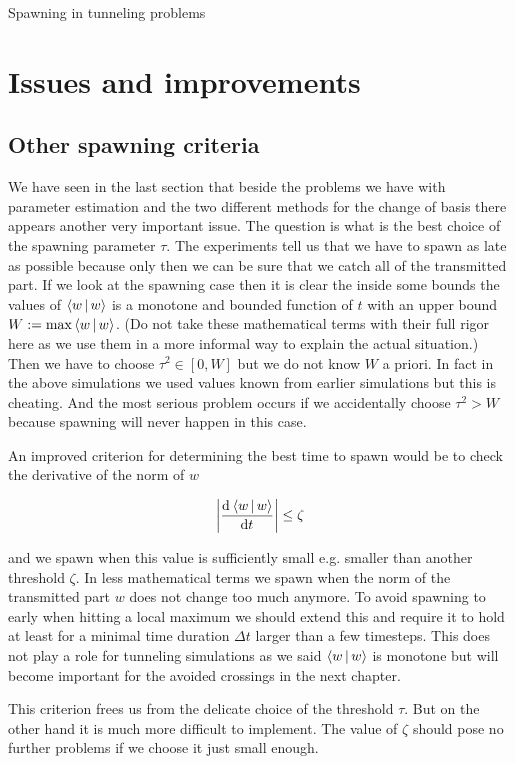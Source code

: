 \begin{chapter}{Spawning in tunneling problems}
\FloatBarrier
\section{Issues and improvements}

\subsection{Other spawning criteria}

We have seen in the last section that beside the problems we have with parameter
estimation and the two different methods for the change of basis there appears
another very important issue. The question is what is the best choice of the
spawning parameter $\tau$. The experiments tell us that we have to spawn as late
as possible because only then we can be sure that we catch all of the transmitted
part. If we look at the spawning case then it is clear the inside some bounds
the values of $\Braket{w|w}$ is a monotone and bounded function of $t$ with
an upper bound $W := \max \Braket{w|w}$. (Do not take these mathematical
terms with their full rigor here as we use them in a more informal way to
explain the actual situation.) Then we have to choose $\tau^2 \in \left[0, W\right]$
but we do not know $W$ a priori. In fact in the above simulations we used values
known from earlier simulations but this is cheating. And the most serious problem
occurs if we accidentally choose $\tau^2 > W$ because spawning will never happen
in this case.

An improved criterion for determining the best time to spawn would be to check
the derivative of the norm of $w$

\begin{equation}
  \left| \frac{\mathrm{d}^{}\Braket{w|w}}{\mathrm{d}t^{}} \right| \leq \zeta
\end{equation}

and we spawn when this value is sufficiently small e.g. smaller than another
threshold $\zeta$. In less mathematical terms we spawn when the norm of the transmitted
part $w$ does not change too much anymore. To avoid spawning to early when hitting 
a local maximum we should extend this and require it to hold at least for a
minimal time duration $\Delta t$ larger than a few timesteps. This does not
play a role for tunneling simulations as we said $\Braket{w|w}$ is monotone but
will become important for the avoided crossings in the next chapter.

This criterion frees us from the delicate choice of the threshold $\tau$. But
on the other hand it is much more difficult to implement. The value of $\zeta$
should pose no further problems if we choose it just small enough.


\end{chapter}
